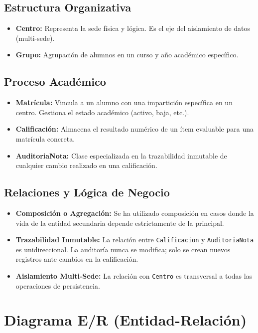 \documentclass[12pt, a4paper]{report}
\begin{document}
\subsection{Estructura Organizativa}
\begin{itemize}
  \item \textbf{Centro:} Representa la sede física y lógica. Es el eje del aislamiento de datos (multi-sede).
  \item \textbf{Grupo:} Agrupación de alumnos en un curso y a\~no académico específico.
\end{itemize}

\subsection{Proceso Académico}
\begin{itemize}
  \item \textbf{Matrícula:} Vincula a un alumno con una impartición específica en un centro. Gestiona el estado académico (activo, baja, etc.).
  \item \textbf{Calificación:} Almacena el resultado numérico de un ítem evaluable para una matrícula concreta.
  \item \textbf{AuditoriaNota:} Clase especializada en la trazabilidad inmutable de cualquier cambio realizado en una calificación.
\end{itemize}

\subsection{Relaciones y Lógica de Negocio}
\begin{itemize}
  \item \textbf{Composición o Agregación:} Se ha utilizado composición en casos donde la vida de la entidad secundaria depende estrictamente de la principal.
  \item \textbf{Trazabilidad Inmutable:} La relación entre \texttt{Calificacion} y \texttt{AuditoriaNota} es unidireccional. La auditoría nunca se modifica; solo se crean nuevos registros ante cambios en la calificación.
  \item \textbf{Aislamiento Multi-Sede:} La relación con \texttt{Centro} es transversal a todas las operaciones de persistencia.
\end{itemize}

\section{Diagrama E/R (Entidad-Relación)}
\end{document}
